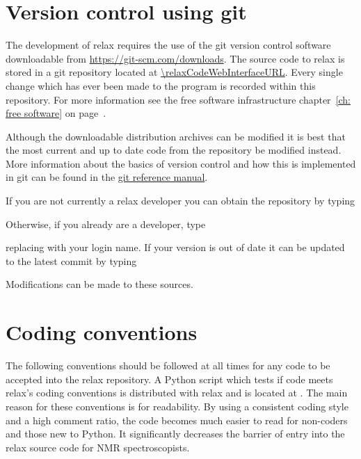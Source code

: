 
\section{Version control using git}\label{git repository}

The development of relax requires the use of the git version control software downloadable from \url{https://git-scm.com/downloads}.
The source code to relax is stored in a git repository located at \url{\relaxCodeWebInterfaceURL}.
Every single change which has ever been made to the program is recorded within this repository.
For more information see the free software infrastructure chapter~\ref{ch: free software} on page~\pageref{ch: free software}.

Although the downloadable distribution archives can be modified it is best that the most current and up to date code from the repository be modified instead.
More information about the basics of version control and how this is implemented in git can be found in the \href{https://git-scm.com/docs}{git reference manual}.

If you are not currently a relax developer you can obtain the repository by typing


Otherwise, if you already are a developer, type


replacing \prompt{[username]} with your login name.
If your version is out of date it can be updated to the latest commit by typing


Modifications can be made to these sources.




\section{Coding conventions}

The following conventions should be followed at all times for any code to be accepted into the relax repository.
A Python script which tests if code meets relax's coding conventions is distributed with relax and is located at .
The main reason for these conventions is for readability.
By using a consistent coding style and a high comment ratio, the code becomes much easier to read for non-coders and those new to Python.
It significantly decreases the barrier of entry into the relax source code for NMR spectroscopists.



